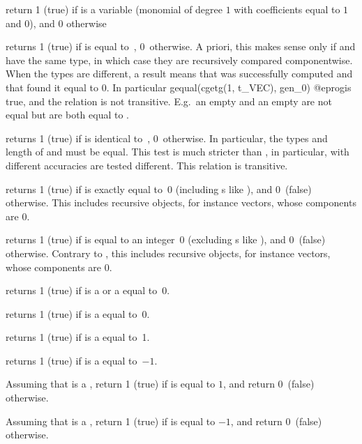  return 1 (true) if  is a variable
(monomial of degree $1$ with  coefficients equal to $1$ and $0$),
and $0$ otherwise

 returns 1 (true) if  is equal
to~, 0~otherwise. A priori, this makes sense only if  and
 have the same type, in which case they are recursively compared
componentwise. When the types are different, a  result
means that  was successfully computed and that
 found it equal to $0$. In particular
\bprog
  gequal(cgetg(1, t_VEC), gen_0)
@eprog\noindent is true, and the relation is not transitive. E.g.~an empty
 and an empty  are not equal but are both equal to
.

 returns 1 (true) if  is identical
to~, 0~otherwise. In particular, the types and length of  and
 must be equal. This test is much stricter than , in
particular,  with different accuracies are tested different. This
relation is transitive.


 returns 1 (true) if  is exactly equal
to~0 (including s like ), and 0~(false) otherwise.
This includes recursive objects, for instance vectors, whose components are $0$.

 returns 1 (true) if  is equal
to an integer~0 (excluding s like ), and 0~(false)
otherwise. Contrary to , this includes recursive objects, for
instance vectors, whose components are $0$.

 returns 1 (true) if  is a  or
a  equal to~0.

 returns 1 (true) if  is a 
equal to~0.

 returns 1 (true) if  is a 
equal to~1.

 returns 1 (true) if  is a 
equal to~$-1$.

Assuming that  is a , return 1 (true) if  is equal to
$1$, and return 0~(false) otherwise.

Assuming that  is a , return 1 (true) if  is equal to
$-1$, and return 0~(false) otherwise.

